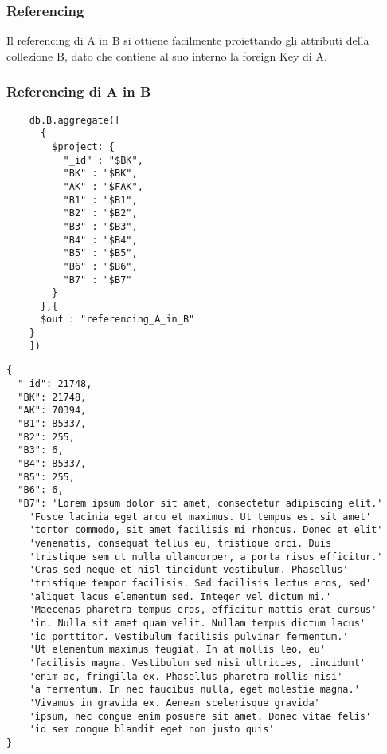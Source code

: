 \subsubsection{Referencing}

Il referencing di A in B si ottiene facilmente proiettando gli attributi della collezione B, dato che contiene al suo interno la foreign Key di A.

\subsubsection{Referencing di A in B}

\begin{verbatim}
    db.B.aggregate([
      {
        $project: {
          "_id" : "$BK",
          "BK" : "$BK",
          "AK" : "$FAK",
          "B1" : "$B1",   
          "B2" : "$B2",
          "B3" : "$B3",
          "B4" : "$B4",
          "B5" : "$B5",
          "B6" : "$B6",
          "B7" : "$B7"
        }
      },{
      $out : "referencing_A_in_B"
    }
    ])
\end{verbatim}

\begin{Verbatim}[frame=single,framesep=2mm,label= Referencing di A in B,labelposition=all]
{
  "_id": 21748,
  "BK": 21748,
  "AK": 70394,
  "B1": 85337,
  "B2": 255,
  "B3": 6,
  "B4": 85337,
  "B5": 255,
  "B6": 6,
  "B7": 'Lorem ipsum dolor sit amet, consectetur adipiscing elit.' 
    'Fusce lacinia eget arcu et maximus. Ut tempus est sit amet'  
    'tortor commodo, sit amet facilisis mi rhoncus. Donec et elit'
    'venenatis, consequat tellus eu, tristique orci. Duis'
    'tristique sem ut nulla ullamcorper, a porta risus efficitur.'
    'Cras sed neque et nisl tincidunt vestibulum. Phasellus' 
    'tristique tempor facilisis. Sed facilisis lectus eros, sed' 
    'aliquet lacus elementum sed. Integer vel dictum mi.'
    'Maecenas pharetra tempus eros, efficitur mattis erat cursus'
    'in. Nulla sit amet quam velit. Nullam tempus dictum lacus'
    'id porttitor. Vestibulum facilisis pulvinar fermentum.'
    'Ut elementum maximus feugiat. In at mollis leo, eu'
    'facilisis magna. Vestibulum sed nisi ultricies, tincidunt'
    'enim ac, fringilla ex. Phasellus pharetra mollis nisi' 
    'a fermentum. In nec faucibus nulla, eget molestie magna.'
    'Vivamus in gravida ex. Aenean scelerisque gravida'
    'ipsum, nec congue enim posuere sit amet. Donec vitae felis'
    'id sem congue blandit eget non justo quis' 
}
\end{Verbatim}

